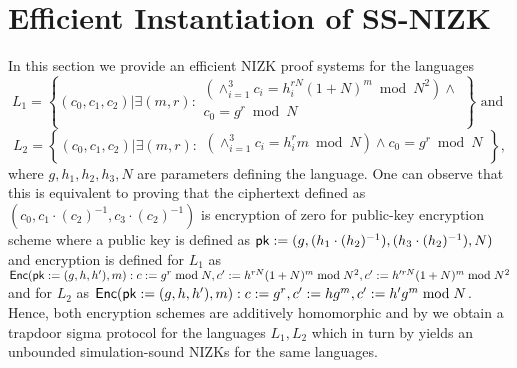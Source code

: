 \section{Efficient Instantiation of SS-NIZK}\label{sec:nizk-crs}
In this section we provide an efficient NIZK proof systems for the languages  
\[
L_1 = \left\{(c_0, c_1, c_2)| \exists (m,r):
\begin{aligned}
       (\land_{i=1}^3 c_i = h_i^{rN}(1+N)^m \bmod N^2) \land \\
       c_0 = g^r \bmod N\\
    \end{aligned}
    \right\} \text{ and } 
\]
\[
L_2 = \left\{(c_0, c_1, c_2)| \exists (m,r):
\begin{aligned}
       (\land_{i=1}^3 c_i = h_i^{r}m \bmod N) \land
       c_0 = g^r \bmod N\\
    \end{aligned}
    \right\},   
\]
where $g, h_1, h_2, h_3, N$ are parameters defining the language. One can observe that this is equivalent to proving that the ciphertext defined as $(c_0, c_1\cdot (c_2)^{-1}, c_3\cdot (c_2)^{-1})$ is encryption of zero for public-key encryption scheme where a public key is defined as $\mathsf{pk}:=(g, (h_1\cdot (h_2)^{-1}), (h_3\cdot (h_2)^{-1}), N)$ and encryption is defined for $L_1$ as $\mathsf{Enc}(\mathsf{pk}:=(g,h,h'),m): c:=g^r \bmod N, c':=h^{rN}(1+N)^m \bmod N^2, c':=h'^{rN}(1+N)^m \bmod N^2$ and for $L_2$ as $\mathsf{Enc}(\mathsf{pk}:=(g,h,h'),m): c:=g^r, c':=hg^m, c':=h'g^m \bmod N$. Hence, both encryption schemes are additively homomorphic and by  we obtain a trapdoor sigma protocol for the languages $L_1, L_2$ which in turn by  yields an unbounded simulation-sound NIZKs for the same languages.  








